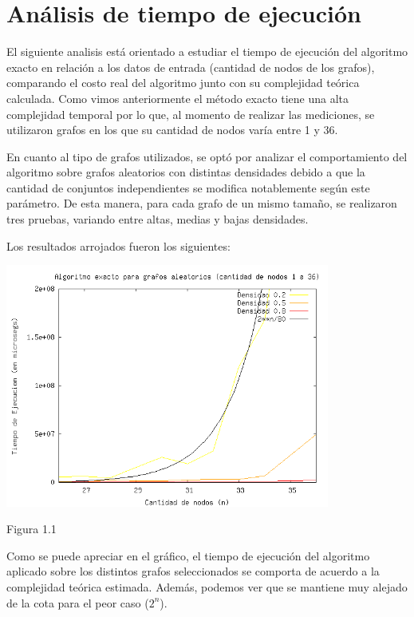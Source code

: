\documentclass[a4paper,11pt] {article}
\begin{document}
\section*{An\'alisis de tiempo de ejecución}

El siguiente analisis est\'a orientado a estudiar el tiempo de ejecuci\'on del algoritmo exacto en relaci\'on a los datos de entrada (cantidad de nodos de los grafos), comparando el costo real del algoritmo junto con su complejidad te\'orica calculada. Como vimos anteriormente el m\'etodo exacto tiene una alta complejidad temporal por lo que, al momento de realizar las mediciones, se utilizaron grafos en los que su cantidad de nodos var\'ia entre 1 y 36.

En cuanto al tipo de grafos utilizados, se opt\'o por analizar el comportamiento del algoritmo sobre grafos aleatorios con distintas densidades debido a que la cantidad de conjuntos independientes se modifica notablemente seg\'un este par\'ametro. De esta manera, para cada grafo de un mismo tama\~{n}o, se realizaron tres pruebas, variando entre altas, medias y bajas densidades.

Los resultados arrojados fueron los siguientes:

\begin{center}
 \includegraphics[width=0.8\textwidth]{graficos/tiemposExacto.png}
\begin{center}
Figura 1.1
\end{center}
\end{center}

Como se puede apreciar en el gr\'afico, el tiempo de ejecuci\'on del algoritmo aplicado sobre los distintos grafos seleccionados se comporta de acuerdo a la complejidad te\'orica estimada. Adem\'as, podemos ver que se mantiene muy alejado de la cota para el peor caso ($2^{n}$).
\end{document}
